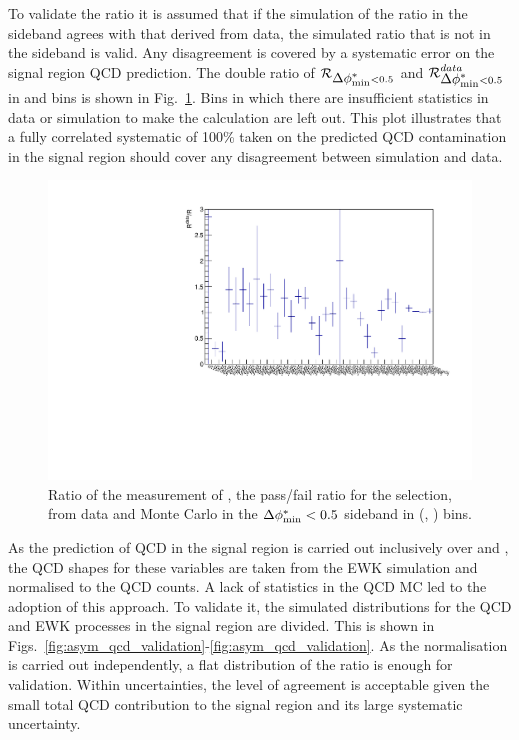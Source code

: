 To
validate the ratio \rmhtmet it is assumed that if the simulation of
the ratio in the \bdphi sideband agrees with that
derived from data, the simulated ratio that is not in the sideband
is valid. Any disagreement is covered by 
a systematic error on the signal region QCD prediction. The double ratio of
$\mbox{$\mathcal{R}$}_{\mbox{$\Delta\phi^{*}_{\rm min}$}<0.5}$ and $\mbox{$\mathcal{R}$}_{\mbox{$\Delta\phi^{*}_{\rm min}$}<0.5}^{data}$ in \scalht
and \njet bins is shown in Fig.~\ref{fig:RR_qcd}. Bins in which there
are insufficient statistics in data or simulation to make the calculation are left out.
This
plot illustrates that a fully correlated systematic of 100\% taken on the
predicted QCD contamination in the signal region should cover any
disagreement between simulation and data.

\begin{figure}[h!]
  \begin{center}        
    \includegraphics[width=\textwidth]{figures/qcd/plots/doubleQcdSbSrRatio1D}
    \caption{ Ratio of the measurement of \rmhtmet, the pass/fail ratio for the \mhtmet selection, from data and Monte Carlo in the $\mbox{$\Delta\phi^{*}_{\rm min}$} < 0.5$ sideband in (\scalht, \njet) bins.  
    }

    \label{fig:RR_qcd}
  \end{center} 
\end{figure}

As the prediction of QCD in the signal region is carried out
inclusively over \nb and \mht, the QCD shapes for these variables are
taken from the EWK simulation and normalised to the QCD counts. 
A lack of statistics in
the QCD MC led to the adoption of this approach. To validate it, the simulated \mht distributions
for the QCD and EWK processes in the signal region are divided. This is shown in
Figs.~\ref{fig:asym_qcd_validation}-\ref{fig:asym_qcd_validation}.
As the normalisation is carried out independently, a flat distribution
of the ratio is enough for validation. Within uncertainties, the level of agreement is acceptable given the
small total QCD contribution to the signal region and its large
systematic uncertainty. 

